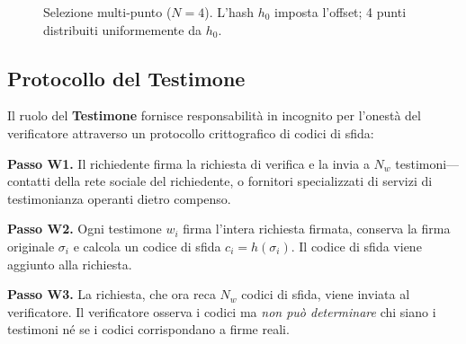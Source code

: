 \documentclass[11pt,a4paper,twocolumn]{article}
\begin{document}
\begin{figure}[ht]
\centering
{}
\caption{Selezione multi-punto ($N{=}4$). L'hash $h_0$ imposta l'offset; 4 punti distribuiti uniformemente da $h_0$.}
\label{fig:multipoint}
\end{figure}

\subsection{Protocollo del Testimone}

Il ruolo del \textbf{Testimone} fornisce responsabilità in incognito per l'onestà del verificatore attraverso un protocollo crittografico di codici di sfida:

\textbf{Passo W1.} Il richiedente firma la richiesta di verifica e la invia a $N_w$ testimoni---contatti della rete sociale del richiedente, o fornitori specializzati di servizi di testimonianza operanti dietro compenso.

\textbf{Passo W2.} Ogni testimone $w_i$ firma l'intera richiesta firmata, conserva la firma originale $\sigma_i$ e calcola un codice di sfida $c_i = h(\sigma_i)$. Il codice di sfida viene aggiunto alla richiesta.

\textbf{Passo W3.} La richiesta, che ora reca $N_w$ codici di sfida, viene inviata al verificatore. Il verificatore osserva i codici ma \emph{non può determinare} chi siano i testimoni né se i codici corrispondano a firme reali.
\end{document}
